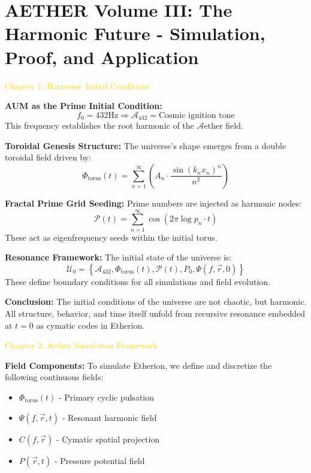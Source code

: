 
\section{AETHER Volume III: The Harmonic Future - Simulation, Proof, and Application}
\label{sec:codex_harmonic_future}

\textcolor{gold}{ Chapter 1: Harmonic Initial Conditions }

\textbf{AUM as the Prime Initial Condition:}
\[
f_0 = 432 \mathrm{Hz} \Rightarrow \mathcal{A}_{432} = \text{Cosmic ignition tone}
\]
This frequency establishes the root harmonic of the $\mathcal{A}$ether field.

\textbf{Toroidal Genesis Structure:}
The universe's shape emerges from a double toroidal field driven by:
\[
\Phi_{\text{torus}}(t) = \sum_{n=1}^{\infty} \left( A_n \cdot \frac{\sin \left( k_n x_n \right)^n}{n^2} \right)
\]

\textbf{Fractal Prime Grid Seeding:}
Prime numbers are injected as harmonic nodes:
\[
\mathcal{P}(t) = \sum_{n=1}^{\infty} \cos \left( 2 \pi \log p_n \cdot t \right)
\]
These act as eigenfrequency seeds within the initial torus.

\textbf{Resonance Framework:}
The initial state of the universe is:
\[
\mathcal{U}_0 = \left\{ \mathcal{A}_{432}, \Phi_{\text{torus}}(t), \mathcal{P}(t), P_0, \Psi(f, \vec{r}, 0) \right\}
\]
These define boundary conditions for all simulations and field evolution.

\textbf{Conclusion:}
The initial conditions of the universe are not chaotic, but harmonic. All structure, behavior, and time itself unfold from recursive resonance embedded at $t=0$ as cymatic codes in Etherion.

\textcolor{gold}{ Chapter 2: Aether Simulation Framework }

\textbf{Field Components:}
To simulate Etherion, we define and discretize the following continuous fields:
\begin{itemize}
    \item \texttt{} $\Phi_{\text{torus}}(t)$ - Primary cyclic pulsation
    \item \texttt{} $\Psi(f, \vec{r}, t)$ - Resonant harmonic field
    \item \texttt{} $C(f, \vec{r})$ - Cymatic spatial projection
    \item \texttt{} $P(\vec{r}, t)$ - Pressure potential field
\end{itemize}

